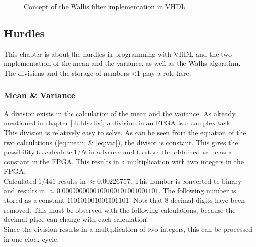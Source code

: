 \begin{figure}[tb!]
    \centering
    \begin{adjustbox}{max width=\textwidth}
        
    \end{adjustbox}
    \caption{Concept of the Wallis filter implementation in VHDL}
    \label{fig:wallis_vhdl}
\end{figure}

\subsection{Hurdles} \label{ch:ip:hurdles_vhdl}
This chapter is about the hurdles in programming with VHDL and the two implementation of the mean and the variance, as well as the Wallis algorithm. The divisions and the storage of numbers <1 play a role here.

\subsubsection*{Mean \& Variance}
A division exists in the calculation of the mean and the variance. As already mentioned in chapter \ref{ch:hls:div}, a division in an FPGA is a complex task. \\
This division is relatively easy to solve. As can be seen from the equation of the two calculations (\ref{eq:mean} \& \ref{eq:var}), the divisor is constant. This gives the possibility to calculate $1/N$ in advance and to store the obtained value as a constant in the FPGA. This results in a multiplication with two integers in the FPGA. \\
Calculated $1/441$ results in $\approx 0.00226757$. This number is converted to binary and results in $\approx 0.0000000000100100101001001101$. The following number is stored as a constant $100101001001001101$. Note that 8 decimal digits have been removed. This must be observed with the following calculations, because the decimal place can change with each calculation! \\
Since the division results in a multiplication of two integers, this can be processed in one clock cycle.


